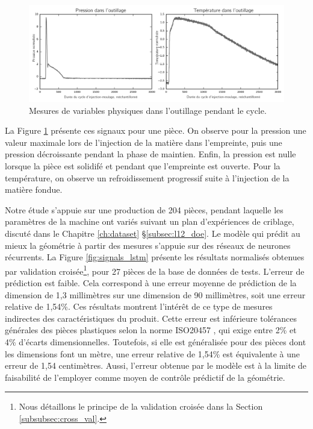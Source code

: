 \begin{figure}[bthp]
	\centering
	\includegraphics[width=\textwidth]{../Chap2/Figures/part1_std_signals.png}
	\caption{Mesures de variables physiques dans l'outillage pendant le cycle.}
	\label{fig:inmold_signals}
\end{figure}

La Figure \ref{fig:inmold_signals} présente ces signaux pour une pièce.
On observe pour la pression une valeur maximale lors de l'injection de la matière dans l'empreinte, puis une pression décroissante pendant la phase de maintien. Enfin, la pression est nulle lorsque la pièce est solidifé et pendant que l'empreinte est ouverte.
Pour la température, on observe un refroidissement progressif suite à l'injection de la matière fondue.

Notre étude  s'appuie sur une production de 204 pièces, pendant laquelle les paramètres de la machine ont variés suivant un plan d'expériences de criblage, discuté dans le Chapitre \ref{ch:dataset} §\ref{subsec:l12_doe}.
Le modèle qui prédit au mieux la géométrie à partir des mesures s'appuie sur des réseaux de neurones récurrents. %
La Figure \ref{fig:signals_lstm} présente les résultats normalisés obtenues par validation croisée\footnote{Nous détaillons le principe de la validation croisée dans la Section \ref{subsubsec:cross_val}.}, pour 27 pièces de la base de données de tests.
L'erreur de prédiction est faible.
Cela correspond à une erreur moyenne de prédiction de la dimension de 1,3 millimètres sur une dimension de 90 millimètres, soit une erreur relative de 1,54\%.
Ces résultats montrent l'intérêt de ce type de mesures indirectes des caractéristiques du produit.
Cette erreur est inférieure tolérances générales des pièces plastiques selon la norme ISO20457 \cite{ISO_20457_2018}, qui exige entre 2\% et 4\% d'écarts dimensionnelles.
Toutefois, si elle est généralisée pour des pièces dont les dimensions font un mètre, une erreur relative de 1,54\% est équivalente à une erreur de 1,54 centimètres.
Aussi, l'erreur obtenue par le modèle est à la limite de faisabilité de l'employer comme moyen de contrôle prédictif de la géométrie.

